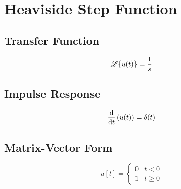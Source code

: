\section*{Heaviside Step Function}
\subsection*{Transfer Function}
\[
    \mathscr{L}\{u(t)\} = \frac{1}{s}
\]

\subsection*{Impulse Response}
\[
    \frac{\mathrm{d}}{\mathrm{d}t}\left(u(t)\right) = \delta(t)
\]

\subsection*{Matrix-Vector Form}
\[
    \underline{u}[t] =
    \begin{cases}
        \underline{0} & t < 0 \\
        \underline{1} & t \geq 0
    \end{cases}
\]